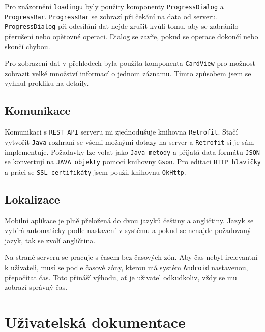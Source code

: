 \documentclass[12pt]{report}
\begin{document}
Pro znázornění \texttt{loadingu} byly použity komponenty \texttt{ProgressDialog} a \texttt{ProgressBar}.
\texttt{ProgressBar} se zobrazí při čekání na data od serveru.
\texttt{ProgressDialog} při odesílání dat nejde zrušit kvůli tomu, aby se zabránilo přerušení nebo opětovné operaci. Dialog se zavře, pokud se operace dokončí nebo skončí chybou.

Pro zobrazení dat v přehledech byla použita komponenta \texttt{CardView} pro možnost zobrazit velké množství informací o jednom záznamu. Tímto způsobem jsem se vyhnul prokliku na detaily.

\section{Komunikace}
	Komunikaci s \texttt{REST API} serveru mi zjednodušuje knihovna \texttt{Retrofit}.
	Stačí vytvořit \texttt{Java} rozhraní se všemi možnými dotazy na server a \texttt{Retrofit} si je sám implementuje.
	Požadavky lze volat jako \texttt{Java metody} a přijatá data formátu \texttt{JSON} se konvertují na \texttt{JAVA objekty} pomocí knihovny \texttt{Gson}. 
	Pro editaci \texttt{HTTP hlavičky} a práci se \texttt{SSL certifikáty} jsem použil knihovnu \texttt{OkHttp}.


\section{Lokalizace}
Mobilní aplikace je plně přeložená do dvou jazyků češtiny a angličtiny.
Jazyk se vybírá automaticky podle nastavení v systému a pokud se nenajde požadovaný jazyk, tak se zvolí angličtina. 

Na straně serveru se pracuje s časem bez časových zón.
Aby čas nebyl irelevantní k uživateli, musí se podle časové zóny, kterou má systém \texttt{Android} nastavenou, přepočítat čas.
Toto přináší výhodu, ať je uživatel odkudkoliv, vždy se mu zobrazí správný čas.

\chapter{Uživatelská dokumentace}

	
\end{document}
